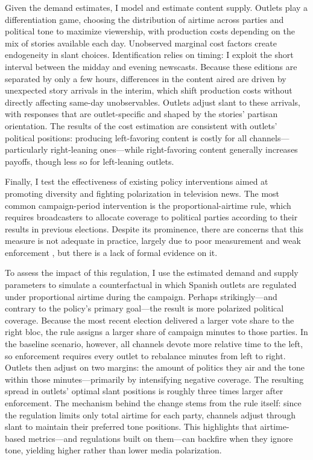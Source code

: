 \documentclass[12pt]{article}
\begin{document}
Given the demand estimates, I model and estimate content supply. Outlets play a differentiation game, choosing the distribution of airtime across parties and political tone to maximize viewership, with production costs depending on the mix of stories available each day. Unobserved marginal cost factors create endogeneity in slant choices. Identification relies on timing: I exploit the short interval between the midday and evening newscasts. Because these editions are separated by only a few hours, differences in the content aired are driven by unexpected story arrivals in the interim, which shift production costs without directly affecting same-day unobservables. Outlets adjust slant to these arrivals, with responses that are outlet-specific and shaped by the stories’ partisan orientation. The results of the cost estimation are consistent with outlets’ political positions: producing left-favoring content is costly for all channels—particularly right-leaning ones—while right-favoring content generally increases payoffs, though less so for left-leaning outlets.

Finally, I test the effectiveness of existing policy interventions aimed at promoting diversity and fighting polarization in television news. The most common campaign-period intervention  is the proportional-airtime rule, which requires broadcasters to allocate coverage to political parties according to their results in previous elections. Despite its prominence, there are concerns that this measure is not adequate in practice, largely due to poor measurement and weak enforcement \citep{cage_assemblee}, but there is a lack of formal evidence on it.



To assess the impact of this regulation, I use the estimated demand and supply parameters to simulate a counterfactual in which Spanish outlets are regulated under proportional airtime during the campaign. Perhaps strikingly—and contrary to the policy’s primary goal—the result is more polarized political coverage. Because the most recent election delivered a larger vote share to the right bloc, the rule assigns a larger share of campaign minutes to those parties. In the baseline scenario, however,  all channels devote more relative time to the left, so enforcement requires every outlet to rebalance minutes from left to right. Outlets then adjust on two margins:  the amount of politics they air and the tone within those minutes—primarily by intensifying negative coverage. The resulting spread in outlets’ optimal slant positions is roughly three times larger after enforcement. The mechanism behind the change stems from the rule itself: since the regulation limits only total airtime for each party, channels adjust through slant to maintain their preferred tone positions. This highlights that airtime-based metrics—and regulations built on them—can backfire when they ignore tone, yielding higher rather than lower media polarization.
\end{document}
